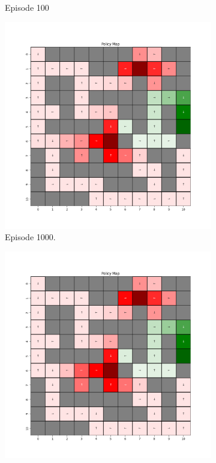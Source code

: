 \documentclass{assignment}
\begin{document}
\begin{figure}[H]
\begin{subfigure}{0.3\textwidth}
    \caption{Episode 100}
    \end{subfigure}
    \begin{subfigure}{0.3\textwidth}
        \includegraphics[width=\textwidth]{figures/policy_td/alpha_sweep/policy_alpha_0.5_gamma_0.95_epsilon_0.2_iteration_1000.png}
    \caption{Episode 1000.}
    \end{subfigure}\hfill
    \begin{subfigure}{0.3\textwidth}
        \includegraphics[width=\textwidth]{figures/policy_td/alpha_sweep/policy_alpha_0.5_gamma_0.95_epsilon_0.2_iteration_5000.png}

\end{subfigure}
\end{figure}
\end{document}
